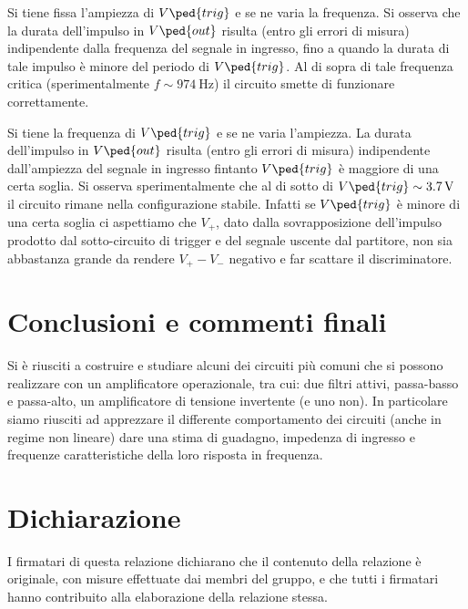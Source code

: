 \documentclass[10pt,a4paper]{article}
\begin{document}
Si tiene fissa l'ampiezza di $ V\ped{trig} $ e se ne varia la frequenza. Si osserva che la durata dell'impulso in $ V \ped{out} $ risulta (entro gli errori di misura) indipendente dalla frequenza del segnale in ingresso, fino a quando la durata di tale impulso è minore del periodo di $ V\ped{trig} $. Al di sopra di tale frequenza critica (sperimentalmente $ f \sim \SI{974}{\hertz} $) il circuito smette di funzionare correttamente.

Si tiene la frequenza di $ V\ped{trig} $ e se ne varia l'ampiezza. La durata dell'impulso in $ V\ped{out} $ risulta (entro gli errori di misura) indipendente dall'ampiezza del segnale in ingresso fintanto $ V\ped{trig} $ è maggiore di una certa soglia. Si osserva sperimentalmente che al di sotto di $ V\ped{trig} \sim \SI{3.7}{\volt} $ il circuito rimane nella configurazione stabile. Infatti se $ V\ped{trig} $ è minore di una certa soglia ci aspettiamo che $ V_{+} $, dato dalla sovrapposizione dell'impulso prodotto dal sotto-circuito di trigger e del segnale uscente dal partitore, non sia abbastanza grande da rendere $ V_{+} - V_{-} $ negativo e far scattare il discriminatore.


\section*{Conclusioni e commenti finali}
Si è riusciti a costruire e studiare alcuni dei circuiti più comuni che si
possono realizzare con un amplificatore operazionale, tra cui: due filtri
attivi, passa-basso e passa-alto, un amplificatore di tensione invertente
(e uno non).
In particolare siamo riusciti ad apprezzare il differente comportamento dei
circuiti (anche in regime non lineare) dare una stima di guadagno, impedenza di
ingresso e frequenze caratteristiche della loro risposta in frequenza.

\section*{Dichiarazione}
I firmatari di questa relazione dichiarano che il contenuto della relazione \`e
originale, con misure effettuate dai membri del gruppo, e che tutti i firmatari
hanno contribuito alla elaborazione della relazione stessa.

\newpage
\end{document}
